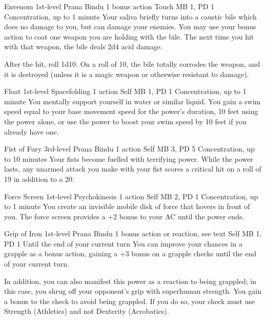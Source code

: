 \DndPowerHeader%
  {Envenom}
  {1st-level Prana Bindu}
  {1 bonus action}
  {Touch}
  {MB 1, PD 1}
  {Concentration, up to 1 minute}
Your saliva briefly turns into a caustic bile
which does no damage to you,
but can damage your enemies.
You may use your bonus action to coat one weapon
you are holding with the bile.
The next time you hit with that weapon,
the bile deals 2d4 acid damage.

After the hit, roll 1d10.
On a roll of 10,
the bile totally corrodes the weapon,
and it is destroyed
(unless it is a magic weapon or otherwise resistant
to damage).

\DndPowerHeader%
  {Float}
  {1st-level Spacefolding}
  {1 action}
  {Self}
  {MB 1, PD 1}
  {Concentration, up to 1 minute}
You mentally support yourself in water or similar liquid.
You gain a swim speed equal to your base movement speed for
the power's duration, 10 feet using the power alone,
or use the power to boost your swim speed by 10 feet if you already have one.

\DndPowerHeader%
  {Fist of Fury}
  {3rd-level Prana Bindu}
  {1 action}
  {Self}
  {MB 3, PD 5}
  {Concentration, up to 10 minutes}
Your fists become fuelled with terrifying power.
While the power lasts,
any unarmed attack you make with your fist
scores a critical hit on a roll of
19 in addition to a 20.

\DndPowerHeader%
  {Force Screen}
  {1st-level Psychokinesis}
  {1 action}
  {Self}
  {MB 2, PD 1}
  {Concentration, up to 1 minute}
You create an invisible mobile disk of force that hovers in front of you.
The force screen provides a +2 bonus to your AC until the power ends.

\DndPowerHeader%
  {Grip of Iron}
  {1st-level Prana Bindu}
  {1 bonus action or reaction, see text}
  {Self}
  {MB 1, PD 1}
  {Until the end of your current turn}
  You can improve your chances in a grapple as a bonus action,
  gaining a +3 bonus on a grapple checks until
  the end of your current turn.

  In addition, you can also manifest this power
  as a reaction to being grappled; in this case, you shrug
  off your opponent's grip with superhuman strength.
  You gain a bonus to the check to avoid being grappled.
  If you do so,
  your check must use Strength (Athletics) and not
  Dexterity (Acrobatics).

